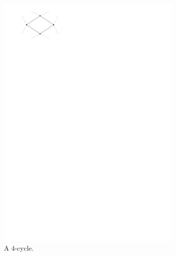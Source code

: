   \begin{figure}
      \centering
      \begin{subfigure}[b]{0.1 \textwidth}
          \includegraphics[width = \textwidth]{introduction/img/4cycle.pdf}
          \caption{A $4$-cycle.}
      \end{subfigure}
      ~
      \begin{subfigure}[b]{0.1 \textwidth}

\end{subfigure}
\end{figure}
